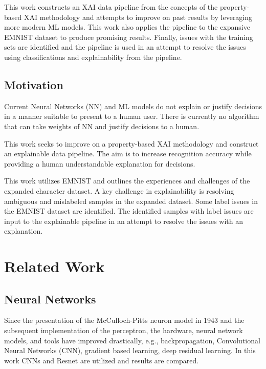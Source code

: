 \documentclass[conference]{IEEEtran}
\begin{document}
This work constructs an XAI data pipeline from the concepts of the
property-based XAI methodology and attempts to improve on past results by
leveraging more modern ML models.  This work also applies the pipeline to the
expansive EMNIST dataset to produce promising results.  Finally, issues with the
training sets are identified and the pipeline is used in an attempt to resolve
the issues using classifications and explainability from the pipeline.

\subsection{Motivation}

Current Neural Networks (NN) and ML models do not explain or justify decisions
in a manner suitable to present to a human user.  There is currently no
algorithm that can take weights of NN and justify decisions to a human.

This work seeks to improve on a property-based XAI methodology and construct an
explainable data pipeline. The aim is to increase recognition accuracy while
providing a human understandable explanation for decisions.

This work utilizes EMNIST and outlines the experiences and challenges of the
expanded character dataset.  A key challenge in explainability is resolving
ambiguous and mislabeled samples in the expanded dataset.  Some label issues in
the EMNIST dataset are identified.  The identified samples with label issues are
input to the explainable pipeline in an attempt to resolve the issues with an
explanation.

\section{Related Work}

\subsection{Neural Networks}

Since the presentation of the McCulloch-Pitts neuron
model\cite{McCulloch1943-MCCALC-5} in 1943 and the subsequent implementation of
the perceptron\cite{rosenblatt1957perceptron}, the hardware, neural network
models, and tools have improved drastically, e.g.,
backpropagation\cite{6795724}, Convolutional Neural Networks
(CNN)\cite{fukushima1982neocognitron}, gradient based learning\cite{726791},
deep residual learning\cite{7780459}.  In this work CNNs and Resnet are utilized
and results are compared.
\end{document}
